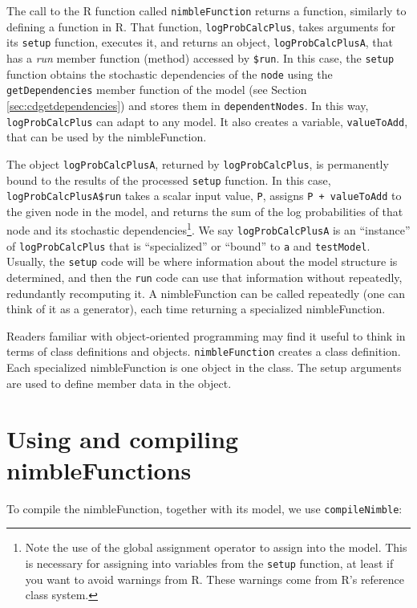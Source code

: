 \documentclass[12pt,oneside]{book}\usepackage[]{graphicx}\usepackage[]{color}
\def\cd#1{\texttt{#1}}
\def\nm#1{\textit{#1}}
\begin{document}
The call to the R function called \cd{nimbleFunction} returns a
function, similarly to defining a function in R. That function,
\cd{logProbCalcPlus}, takes arguments for its \cd{setup} function,
executes it, and returns an object, \cd{logProbCalcPlusA}, that has a
\nm{run} member function (method) accessed by \cd{\$run}.  In this case, the
\cd{setup} function obtains the stochastic dependencies of the
\cd{node} using the \cd{getDependencies} member function of the model
(see Section \ref{sec:cdgetdependencies}) and stores them in
\cd{dependentNodes}.  In this way, \cd{logProbCalcPlus} can adapt to any
model.  It also creates a variable, \cd{valueToAdd}, that can be used by the nimbleFunction.

The object \cd{logProbCalcPlusA}, returned by \cd{logProbCalcPlus},
is permanently bound to the results of the processed \cd{setup}
function.  In this case, \cd{logProbCalcPlusA\$run} takes a scalar input value, \cd{P},
assigns \cd{P + valueToAdd} to
the given node in the model, and returns the sum of the log
probabilities of that node and its stochastic
dependencies\footnote{Note the use of the global assignment operator
  to assign into the model.  This is necessary for assigning into
  variables from the \cd{setup} function, at least if you want to avoid
  warnings from R.  These warnings come from R's reference class
  system.}.  We say  \cd{logProbCalcPlusA} is an ``instance'' of
\cd{logProbCalcPlus} that is
``specialized'' or ``bound'' to \cd{a} and \cd{testModel}.  Usually, the
\cd{setup} code will be where information about the model
structure is determined, and then the \cd{run} code can use that
information without repeatedly, redundantly recomputing it.  A
nimbleFunction can
be called repeatedly (one can think of it as a generator), each time returning a specialized
nimbleFunction. 
  
Readers familiar with object-oriented programming may find it useful
to think in terms of class definitions and objects.  \cd{nimbleFunction}
creates a class definition.  Each specialized nimbleFunction is one object
in the class.  The setup arguments are used to define member data in
the object. 

\section{Using and compiling nimbleFunctions}
\label{sec:using-comp-nimbl}

To compile the nimbleFunction, together with its model, we use \cd{compileNimble}:
\end{document}
